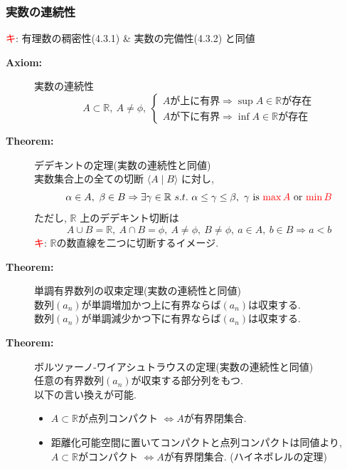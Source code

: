 \documentclass[english,dvipdfmx]{jsarticle}
\newcommand{\average}[1]{\ensuremath{\langle#1\rangle} }
\newcommand*{\point}{\textcircled{\textcolor{red}{\scriptsize キ}}}
\begin{document}
    \subsubsection{実数の連続性}
    \point : 有理数の稠密性(4.3.1) \& 実数の完備性(4.3.2) と同値
    \begin{description}
        \item[\bf{Axiom:}] 実数の連続性 \\
            \begin{equation*} 
                A \subset \mathbb{R},\ A \neq \phi,\ 
                \begin{cases}
                A\text{が上に有界} \Rightarrow \sup A \in \mathbb{R} \text{が存在}  \\
                A\text{が下に有界} \Rightarrow \inf A \in \mathbb{R} \text{が存在}
                \end{cases} 
            \end{equation*}
        \item[\bf{Theorem:}] デデキントの定理(実数の連続性と同値)\\
            実数集合上の全ての切断 $\average{A \mid B}$ に対し,
            \begin{equation*}
                \alpha \in A ,\ \beta \in B \Rightarrow \exists \gamma \in \mathbb{R} \ s.t. \ \alpha \leq \gamma \leq \beta ,\ \gamma \text{ is } {\color{red}{\max A}} \text{ or } {\color{red}{\min B}}
            \end{equation*}
            ただし, $\mathbb{R}$ 上のデデキント切断は
            \begin{equation*}
                A \cup B = \mathbb{R},\ A \cap B = \phi,\ A \neq \phi,\ B \neq \phi,\ a \in A,\ b \in B \Rightarrow a < b
            \end{equation*}
            \point : $\mathbb{R}$の数直線を二つに切断するイメージ.

        \item[\bf{Theorem:}] 単調有界数列の収束定理(実数の連続性と同値) \\
            数列$(a_n)$が単調増加かつ上に有界ならば$(a_n)$は収束する. \\
            数列$(a_n)$が単調減少かつ下に有界ならば$(a_n)$は収束する.
        
        \item[\bf{Theorem:}] ボルツァーノ-ワイアシュトラウスの定理(実数の連続性と同値)\\
            任意の有界数列$(a_n)$が収束する部分列をもつ. \\
            以下の言い換えが可能.
            \begin{itemize}
                \item $A \subset \mathbb{R}$が点列コンパクト $\Leftrightarrow A$が有界閉集合.
                \item 距離化可能空間に置いてコンパクトと点列コンパクトは同値より, \\ 
                $A \subset \mathbb{R}$がコンパクト $\Leftrightarrow A$が有界閉集合. (ハイネボレルの定理)
            \end{itemize}
            


\end{description}
\end{document}

